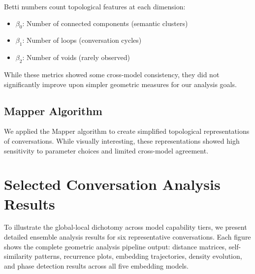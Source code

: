 \documentclass[11pt,letterpaper]{article}
\begin{document}
Betti numbers count topological features at each dimension:
\begin{itemize}
\item $\beta_0$: Number of connected components (semantic clusters)
\item $\beta_1$: Number of loops (conversation cycles)
\item $\beta_2$: Number of voids (rarely observed)
\end{itemize}

While these metrics showed some cross-model consistency, they did not significantly improve upon simpler geometric measures for our analysis goals.

\subsection{Mapper Algorithm}

We applied the Mapper algorithm to create simplified topological representations of conversations. While visually interesting, these representations showed high sensitivity to parameter choices and limited cross-model agreement.

\section{Selected Conversation Analysis Results}

To illustrate the global-local dichotomy across model capability tiers, we present detailed ensemble analysis results for six representative conversations. Each figure shows the complete geometric analysis pipeline output: distance matrices, self-similarity patterns, recurrence plots, embedding trajectories, density evolution, and phase detection results across all five embedding models.

\afterpage{%
\clearpage
\thispagestyle{empty}

}

\afterpage{%
\clearpage
\thispagestyle{empty}

}

\afterpage{%
\clearpage
\thispagestyle{empty}

}
\end{document}
